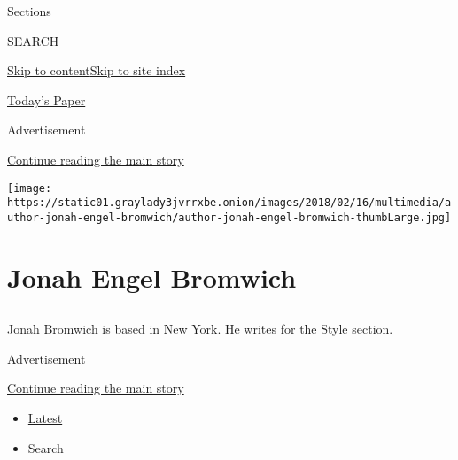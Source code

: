 Sections

SEARCH

\protect\hyperlink{site-content}{Skip to
content}\protect\hyperlink{site-index}{Skip to site index}

\href{https://myaccount.nytimes3xbfgragh.onion/auth/login?response_type=cookie\&client_id=vi}{}

\href{https://www.nytimes3xbfgragh.onion/section/todayspaper}{Today's
Paper}

Advertisement

\protect\hyperlink{after-top}{Continue reading the main story}

\texttt{[image: https://static01.graylady3jvrrxbe.onion/images/2018/02/16/multimedia/author-jonah-engel-bromwich/author-jonah-engel-bromwich-thumbLarge.jpg]}

\hypertarget{jonah-engel-bromwich}{%
\section{Jonah Engel Bromwich}\label{jonah-engel-bromwich}}

\subsection{}

Jonah Bromwich is based in New York. He writes for the Style section.

Advertisement

\protect\hyperlink{after-mid1}{Continue reading the main story}

\begin{itemize}
\tightlist
\item
  \protect\hyperlink{stream-panel}{Latest}
\item
  Search
\end{itemize}

